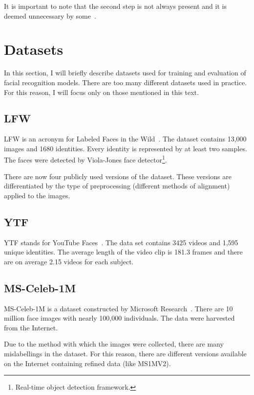 It is important to note that the second step is not always present and it is deemed unnecessary by some~\cite{FaceNet}.





\section{Datasets}\label{sec:datasets}
In this section, I will briefly describe datasets used for training and evaluation of facial recognition models.
There are too many different datasets used in practice.
For this reason, I will focus only on those mentioned in this text.

\subsection{LFW}\label{subsec:lfw}
LFW is an acronym for Labeled Faces in the Wild~\cite{LFW}.
The dataset contains 13,000 images and 1680 identities.
Every identity is represented by at least two samples.
The faces were detected by Viola-Jones face detector\footnote{Real-time object detection framework.}.

There are now four publicly used versions of the dataset.
These versions are differentiated by the type of preprocessing (different methods of alignment) applied to the images.

\subsection{YTF}\label{subsec:ytf}
YTF stands for YouTube Faces~\cite{YTF}.
The data set contains 3425 videos and 1,595 unique identities.
The average length of the video clip is 181.3 frames and there are on average 2.15 videos for each subject.

\subsection{MS-Celeb-1M}\label{subsec:ms1m}
MS-Celeb-1M is a dataset constructed by Microsoft Research~\cite{MSCeleb1M}.
There are 10 million face images with nearly 100,000 individuals.
The data were harvested from the Internet.

Due to the method with which the images were collected, there are many mislabellings in the dataset.
For this reason, there are different versions available on the Internet containing refined data (like MS1MV2).

